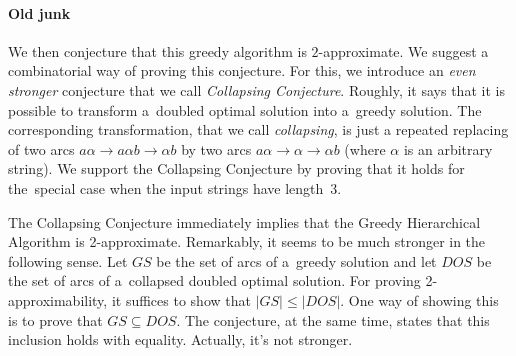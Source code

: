 \paragraph{Old junk}
We then conjecture that this greedy algorithm is $2$-approximate. We suggest a combinatorial way of proving this conjecture. For this, we introduce an {\em even stronger} conjecture that we call 
{\em Collapsing Conjecture}. 
Roughly, it says that it is possible to transform a~doubled optimal 
solution into a~greedy solution. 
The corresponding transformation, that we call {\em collapsing}, 
is just a repeated replacing of two arcs $a\alpha \to a\alpha b \to \alpha b$ 
by two arcs $a\alpha \to \alpha \to \alpha b$ (where $\alpha$ is an arbitrary string). 
We support the Collapsing Conjecture by 
proving that it holds for the~special case when the input strings have length~3.



The Collapsing Conjecture immediately implies that the Greedy
Hierarchical Algorithm is 2-approximate. Remarkably, it seems to be much
stronger in the following sense. Let $GS$ be the set of arcs of a~greedy
solution and let $DOS$ be the set of arcs of a~collapsed doubled optimal
solution. For proving 2-approximability, it suffices to show that $|GS| \le |DOS|$. 
One way of showing this is to prove that $GS \subseteq DOS$. 
The conjecture, at the same time, states that this inclusion holds with equality. Actually, it's not stronger.


